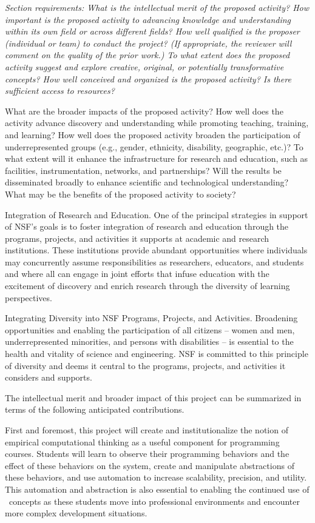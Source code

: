 {\em Section requirements: What is the intellectual merit of the proposed
activity?  How important is the proposed activity to advancing knowledge
and understanding within its own field or across different fields? How well
qualified is the proposer (individual or team) to conduct the project? (If
appropriate, the reviewer will comment on the quality of the prior work.)
To what extent does the proposed activity suggest and explore creative,
original, or potentially transformative concepts? How well conceived and
organized is the proposed activity? Is there sufficient access to
resources?

What are the broader impacts of the proposed activity?  How well does the
activity advance discovery and understanding while promoting teaching,
training, and learning? How well does the proposed activity broaden the
participation of underrepresented groups (e.g., gender, ethnicity,
disability, geographic, etc.)? To what extent will it enhance the
infrastructure for research and education, such as facilities,
instrumentation, networks, and partnerships? Will the results be
disseminated broadly to enhance scientific and technological understanding?
What may be the benefits of the proposed activity to society?

Integration of Research and Education.  One of the principal strategies in
support of NSF's goals is to foster integration of research and education
through the programs, projects, and activities it supports at academic and
research institutions. These institutions provide abundant opportunities
where individuals may concurrently assume responsibilities as researchers,
educators, and students and where all can engage in joint efforts that
infuse education with the excitement of discovery and enrich research
through the diversity of learning perspectives.

Integrating Diversity into NSF Programs, Projects, and Activities.
Broadening opportunities and enabling the participation of all citizens --
women and men, underrepresented minorities, and persons with disabilities
-- is essential to the health and vitality of science and engineering. NSF
is committed to this principle of diversity and deems it central to the
programs, projects, and activities it considers and supports.}
\bigskip

The intellectual merit and broader impact of this project can be summarized
in terms of the following anticipated contributions.

First and foremost, this project will create and institutionalize the
notion of empirical computational thinking as a useful component for
programming courses.  Students will learn to observe their programming
behaviors and the effect of these behaviors on the system, create and
manipulate abstractions of these behaviors, and use automation to increase
scalability, precision, and utility.  This automation and abstraction is also
essential to enabling the continued use of \eCT\ concepts as these students
move into professional environments and encounter more complex development
situations.

